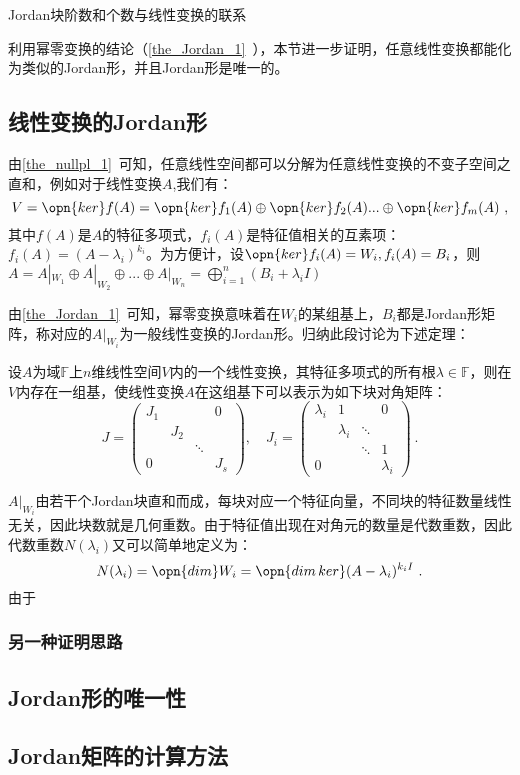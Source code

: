 

\begin{issues}
\issueDraft
\issueTODO Jordan块阶数和个数与线性变换的联系
\end{issues}
利用幂零变换的结论（\autoref{the_Jordan_1}~），本节进一步证明，任意线性变换都能化为类似的Jordan形，并且Jordan形是唯一的。
\subsection{线性变换的Jordan形}
由\autoref{the_nullpl_1}~可知，任意线性空间都可以分解为任意线性变换的不变子空间之直和，例如对于线性变换$A$,我们有：
\begin{equation}
V=\opn{ker}f(A)=\opn{ker}f_1(A)\oplus\opn{ker}f_2(A)...\oplus\opn{ker}f_m(A)~,
\end{equation}
其中$f(A)$是$A$的特征多项式，$f_i(A)$是特征值相关的互素项：$f_i(A)=(A-\lambda_i)^{k_i}$。为方便计，设$\opn{ker}f_i(A)=W_i,f_i(A)=B_i$，则$A=A|_{W_1}\oplus A|_{W_2}\oplus...\oplus A|_{W_n}=\bigoplus^n_{i=1}(B_i+\lambda_iI)$

由\autoref{the_Jordan_1}~可知，幂零变换意味着在$W_i$的某组基上，$B_i$都是Jordan形矩阵，称对应的$A|_{W_i}$为一般线性变换的Jordan形。归纳此段讨论为下述定理：
\begin{theorem}{}
设$A$为域$\mathbb F$上$n$维线性空间$V$内的一个线性变换，其特征多项式的所有根$\lambda\in\mathbb F$，则在$V$内存在一组基，使线性变换$A$在这组基下可以表示为如下块对角矩阵：
\begin{equation}
J=\left(\begin{array}{cccc}
J_1 & & & 0 \\
& J_2 & & \\
& & \ddots & \\
0 & & & J_s
\end{array}\right), \quad J_i=\left(\begin{array}{cccc}
\lambda_i & 1 & & 0 \\
& \lambda_i & \ddots & \\
& & \ddots & 1 \\
0 & & & \lambda_i
\end{array}\right)~.
\end{equation}
\end{theorem}
$A|_{W_i}$由若干个Jordan块直和而成，每块对应一个特征向量，不同块的特征数量线性无关，因此块数就是几何重数。由于特征值出现在对角元的数量是代数重数，因此代数重数$N(\lambda_i)$又可以简单地定义为：
\begin{equation}
N(\lambda_i)=\opn{dim}W_i=\opn{dim\,ker}(A-\lambda_i)^{k_i I}~.
\end{equation}
由于
\subsubsection{另一种证明思路}

\subsection{Jordan形的唯一性}

\subsection{Jordan矩阵的计算方法}